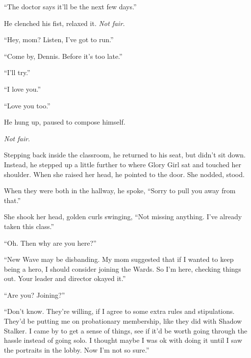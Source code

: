 ``The doctor says it'll be the next few days.''



He clenched his fist, relaxed it.  \emph{Not fair.}



``Hey, mom?  Listen, I've got to run.''



``Come by, Dennis.  Before it's too late.''



``I'll try.''



``I love you.''



``Love you too.''



He hung up, paused to compose himself.



\emph{Not fair.}



Stepping back inside the classroom, he returned to his seat, but didn't sit down.  Instead, he stepped up a little further to where Glory Girl sat and touched her shoulder.  When she raised her head, he pointed to the door.  She nodded, stood.



When they were both in the hallway, he spoke, ``Sorry to pull you away from that.''



She shook her head, golden curls swinging, ``Not missing anything.  I've already taken this class.''



``Oh.  Then why are you here?''



``New Wave may be disbanding.  My mom suggested that if I wanted to keep being a hero, I should consider joining the Wards.  So I'm here, checking things out.  Your leader and director okayed it.''



``Are you?  Joining?''



``Don't know.  They're willing, if I agree to some extra rules and stipulations.  They'd be putting me on probationary membership, like they did with Shadow Stalker.  I came by to get a sense of things, see if it'd be worth going through the hassle instead of going solo.  I thought maybe I was ok with doing it until I saw the portraits in the lobby.  Now I'm not so sure.''



